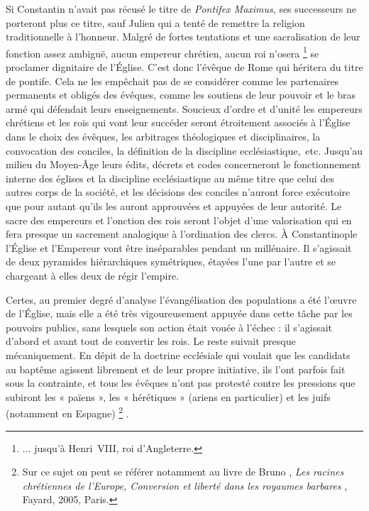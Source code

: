  Si Constantin n'avait pas récusé le titre de \emph{Pontifex Maximus}, ses successeurs ne porteront plus ce titre, sauf Julien qui a tenté de remettre la religion traditionnelle à l'honneur. Malgré de fortes tentations et une sacralisation de leur fonction assez ambiguë, aucun empereur chrétien, aucun roi n'osera%
\footnote{... jusqu'à Henri~VIII, roi d'Angleterre.} 
se proclamer dignitaire de l'Église. C'est donc l'évêque de Rome qui héritera du titre de pontife. Cela ne les empêchait pas de se considérer comme les partenaires permanents et obligés des évêques, comme les soutiens de leur pouvoir et le bras armé qui défendait leurs enseignements. Soucieux d'ordre et d'unité les empereurs chrétiens et les rois qui vont leur succéder seront étroitement associés à l'Église dans le choix des évêques, les arbitrages théologiques et disciplinaires, la convocation des conciles, la définition de la discipline ecclésiastique,~etc. Jusqu'au milieu du Moyen-Âge leurs édits, décrets et codes concerneront le fonctionnement interne des églises et la discipline ecclésiastique au même titre que celui des autres corps de la société, et les décisions des conciles n'auront force exécutoire que pour autant qu'ils les auront approuvées et appuyées de leur autorité. Le sacre des empereurs et l'onction des rois seront l'objet d'une valorisation qui en fera presque un sacrement analogique à l'ordination des clercs. À Constantinople l'Église et l'Empereur vont être inséparables pendant un millénaire. Il s'agissait de deux pyramides hiérarchiques symétriques, étayées l'une par l'autre et se chargeant à elles deux de régir l'empire. 

 Certes, au premier degré d'analyse l'évangélisation des populations a été l'œuvre de l'Église, mais elle a été très vigoureusement appuyée dans cette tâche par les pouvoirs publics, sans lesquels son action était vouée à l'échec : il s'agissait d'abord et avant tout de convertir les rois. Le reste suivait presque mécaniquement. En dépit de la doctrine ecclésiale qui voulait que les candidats au baptême agissent librement et de leur propre initiative, ils l'ont parfois fait sous la contrainte, et tous les évêques n'ont pas protesté contre les pressions que subiront les « païens », les « hérétiques » (ariens en particulier) et les juifs (notamment en Espagne)%
\footnote{Sur ce sujet on peut se référer notamment au livre de Bruno , \emph{Les racines chrétiennes de l'Europe, Conversion et liberté dans les royaumes barbares }, Fayard, 2005, Paris.}%
. 

